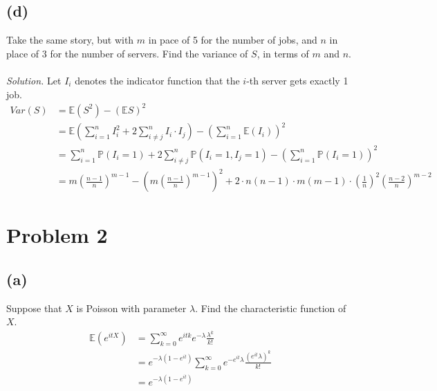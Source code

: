 \documentclass{article}
\newcommand{\prob}{\mathbb{P}}
\newcommand{\E}{\mathbb{E}}
\begin{document}
\subsection*{(d)}
Take the same story, but with $m$ in pace of 5 for the number of jobs, and $n$ in place of 3 for the number of servers. Find the variance of $S$, in terms of $m$ and $n$.
\color{blue}
\\\\\textit{Solution. }Let $I_i$ denotes the indicator function that the $i$-th server gets exactly 1 job.
\begin{equation*}
    \begin{split}
        Var(S) &= \E(S^2)-(\E S)^2\\
        &= \E(\sum_{i=1}^nI_i^2+2\sum_{i\neq j}^nI_i\cdot I_j)-\left(\sum_{i=1}^n\E(I_i)\right)^2\\
        &= \sum_{i=1}^n\prob(I_i=1)+2\sum_{i\neq j}^n\prob(I_i=1,I_j=1)-\left(\sum_{i=1}^n\prob(I_i=1)\right)^2\\
        &= m\left(\frac{n-1}{n}\right)^{m-1}-\left(m\left(\frac{n-1}{n}\right)^{m-1}\right)^2+2\cdot n(n-1)\cdot m(m-1)\cdot\left(\frac{1}{n}\right)^2 \left(\frac{n-2}{n}\right)^{m-2}
    \end{split}
\end{equation*}
\color{black}
\section*{Problem 2}
\subsection*{(a)}
Suppose that $X$ is Poisson with parameter $\lambda$. Find the characteristic function of $X$.
\color{blue}
\begin{equation*}
    \begin{split}
        \E(e^{itX}) &= \sum_{k=0}^\infty e^{itk}e^{-\lambda}\frac{\lambda^k}{k!}\\
        &=e^{-\lambda(1-e^{it})}\sum_{k=0}^\infty e^{-e^{it}\lambda}\frac{(e^{it}\lambda)^k}{k!}\\
        &=e^{-\lambda(1-e^{it})}
    \end{split}
\end{equation*}
\color{black}
\end{document}
